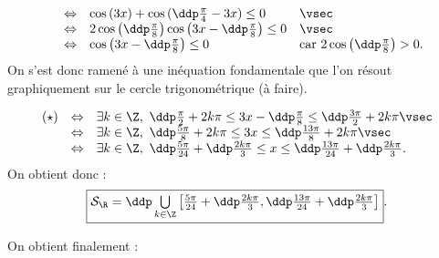 \begin{correction}
\begin{enumerate}
$$\begin{array}{llll}
&\Leftrightarrow &  \cos{(3x)}+\cos{(\ddp\frac{\pi}{4}-3x)}\leq 0 & \vsec\\
&\Leftrightarrow & 2\cos{\left(\ddp\frac{\pi}{8}\right)}\cos{\left(3x-\ddp\frac{\pi}{8}\right)}\leq 0&\vsec\\
&\Leftrightarrow &  \cos{\left(3x-\ddp\frac{\pi}{8}\right)}\leq  0& \hbox{car}\ 2\cos{\left(\ddp\frac{\pi}{8}\right)}>0.
\end{array}$$
On s'est donc ramen\'e \`a une in\'equation fondamentale que l'on r\'esout graphiquement sur le cercle trigonom\'etrique (\`a faire).\\
\begin{minipage}[c]{0.45\textwidth}
$$\begin{array}{lll}
(\star)&\Leftrightarrow & \exists k\in\Z,\ \ddp\frac{\pi}{2}+2k\pi \leq  3x-\ddp\frac{\pi}{8}\leq \ddp\frac{3\pi}{2}+2k\pi\vsec\\
&\Leftrightarrow & \exists k\in\Z,\ \ddp\frac{5\pi}{8}+2k\pi \leq  3x\leq \ddp\frac{13\pi}{8}+2k\pi\vsec\\
&\Leftrightarrow & \exists k\in\Z,\ \ddp\frac{5\pi}{24}+\ddp\frac{2k\pi}{3} \leq  x\leq \ddp\frac{13\pi}{24}+\ddp\frac{2k\pi}{3}.
\end{array}$$
On obtient donc :
$$\fbox{$ \mathcal{S}_{\R}=  \ddp \mathop{\bigcup}\limits_{k \in \Z} \left[ \frac{5\pi}{24}+\ddp\frac{2k\pi}{3} , \ddp\frac{13\pi}{24}+\ddp\frac{2k\pi}{3}\right]$}.$$
\end{minipage}
\quad \begin{minipage}[c]{0.45\textwidth}
\begin{center}
\end{center}
\end{minipage}
On obtient finalement :

\end{enumerate}
\end{correction}
